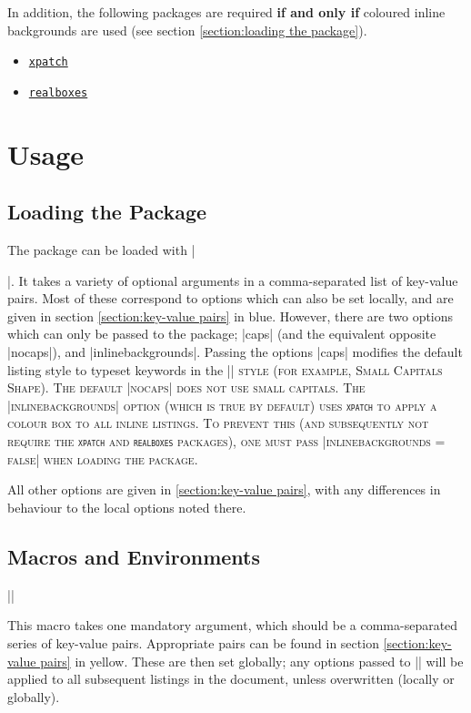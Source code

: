 \documentclass{article}
\newcommand{\ttt}[1]{\texttt{#1}}
\begin{document}
In addition, the following packages are required \textbf{if and only if} coloured inline backgrounds are used (see section \ref{section:loading the package}).
\begin{itemize}
    \item \href{https://ctan.org/pkg/xpatch}{\ttt{xpatch}}
    \item \href{https://ctan.org/pkg/realboxes}{\ttt{realboxes}}
\end{itemize}

\section{Usage}

\subsection{Loading the Package\label{section:loading the package}}

The package can be loaded with \qoinline[language = {[LaTeX]TeX}]|\usepackage{qolistings}|. It takes a variety of optional arguments in a comma-separated list of key-value pairs. Most of these correspond to options which can also be set locally, and are given in section \ref{section:key-value pairs} in \textcolor{Accent2}{blue}. However, there are two options which can only be passed to the package; \qoinline|caps| (and the equivalent opposite \qoinline|nocaps|), and \qoinline|inlinebackgrounds|. Passing the options \qoinline|caps| modifies the default listing style to typeset keywords in the \qoinline|\scshape| style (for example, \textsc{Small Capitals Shape}). The default \qoinline|nocaps| does not use small capitals. The \qoinline|inlinebackgrounds| option (which is true by default) uses \ttt{xpatch} to apply a colour box to all inline listings. To prevent this (and subsequently not require the \ttt{xpatch} and \ttt{realboxes} packages), one must pass \qoinline|inlinebackgrounds = false| when loading the package.

All other options are given in \ref{section:key-value pairs}, with any differences in behaviour to the local options noted there.

\subsection{Macros and Environments}

\noindent\qoinline|\qolstset{}|

This macro takes one mandatory argument, which should be a comma-separated series of key-value pairs. Appropriate pairs can be found in section \ref{section:key-value pairs} in \textcolor{Accent1}{yellow}. These are then set globally; any options passed to \qoinline|\qolstset{}| will be applied to all subsequent listings in the document, unless overwritten (locally or globally).
\end{document}
